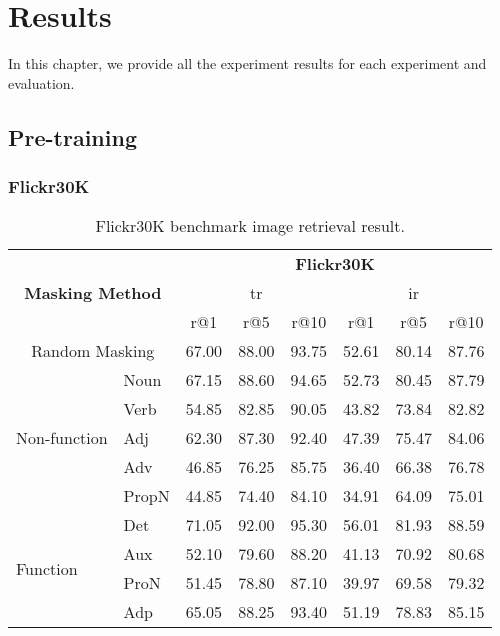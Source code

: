\chapter{Results}
In this chapter, we provide all the experiment results for each experiment and evaluation.

\section{Pre-training}

\subsection{Flickr30K}

\begin{table}[]
    \centering
    \label{tab:flickr30k}
    \caption{Flickr30K benchmark image retrieval result.}
    \begin{tabular}{ll|ccc|ccc}
        \hline
        \multicolumn{2}{c|}{\multirow{3}{*}{\textbf{Masking Method}}} & \multicolumn{6}{c}{\textbf{Flickr30K}} \\
        \multicolumn{2}{l|}{} & \multicolumn{3}{c|}{\acrshort{tr}} & \multicolumn{3}{c}{\acrshort{ir}} \\
        \multicolumn{2}{l|}{} & r@1 & r@5 & r@10 & r@1 & r@5 & r@10 \\
        \hline
        \multicolumn{2}{c|}{Random Masking} & \cellcolor{yellow}67.00 & 88.00 & 93.75 & 52.61 & 80.14 & 87.76 \\
        \hline
        \multirow{5}{*}{Non-function} & Noun & 67.15 & 88.60 & 94.65 & 52.73 & 80.45 & 87.79 \\
        & Verb & 54.85 & 82.85 & 90.05 & 43.82 & 73.84 & 82.82 \\
        & Adj & 62.30 & 87.30 & 92.40 & 47.39 & 75.47 & 84.06 \\
        & Adv & 46.85 & 76.25 & 85.75 & 36.40 & 66.38 & 76.78 \\
        & PropN & 44.85 & 74.40 & 84.10 & 34.91 & 64.09 & 75.01 \\
        \hline
        \multirow{4}{*}{Function} & Det & 71.05 & 92.00 & 95.30 & 56.01 & 81.93 & 88.59 \\
        & Aux  & 52.10 & 79.60 & 88.20 & 41.13 & 70.92 & 80.68 \\
        & ProN & 51.45 & 78.80 & 87.10 & 39.97 & 69.58 & 79.32 \\
        & Adp & 65.05 & 88.25 & 93.40 & 51.19 & 78.83 & 85.15 \\
        \hline
    \end{tabular}
\end{table}

